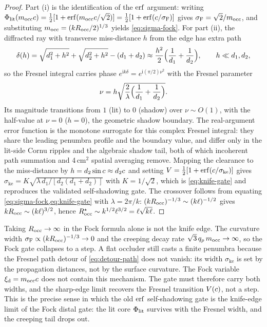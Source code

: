 \begin{proof}
Part (i) is the identification of the $\erf$ argument: writing
$\Philit(\mfock_{\mathrm{occ}}\clr)=\half[1+\erf(\mfock_{\mathrm{occ}}\clr/\sqrt2)]
=\half[1+\erf(\clr/\sigma_{\mathrm{F}})]$ gives
$\sigma_{\mathrm{F}}=\sqrt2/m_{\mathrm{occ}}$, and substituting
$m_{\mathrm{occ}}=(kR_{\mathrm{occ}}/2)^{1/3}$ yields \cref{eq:sigma-fock}. For part (ii),
the diffracted ray with transverse miss-distance $h$ from the edge has extra path
\begin{equation}\label{eq:detour-path}
  \delta(h) = \sqrt{d_1^2+h^2}+\sqrt{d_2^2+h^2}-(d_1+d_2)
  \approx \frac{h^2}{2}\Bigl(\frac1{d_1}+\frac1{d_2}\Bigr),
  \qquad h\ll d_1,d_2,
\end{equation}
so the Fresnel integral carries phase $e^{\mathrm{i}k\delta}=e^{\mathrm{i}(\pi/2)\nu^2}$
with the Fresnel parameter
\begin{equation}\label{eq:fresnel-nu}
  \nu = h\sqrt{\frac{2}{\lambda}\Bigl(\frac1{d_1}+\frac1{d_2}\Bigr)}.
\end{equation}
Its magnitude transitions from $1$ (lit) to $0$ (shadow) over $\nu\sim O(1)$, with
the half-value at $\nu=0$ ($h=0$), the geometric shadow boundary. The
real-argument error function is the monotone surrogate for this complex Fresnel
integral: they share the leading penumbra profile and the boundary value, and
differ only in the lit-side Cornu ripples and the algebraic shadow tail, both of
which incoherent path summation and 4\,cm$^2$ spatial averaging remove. Mapping
the clearance to the miss-distance by $h=d_2\sin c\approx d_2c$ and setting
$V=\half[1+\erf(\clr/\sigma_{\mathrm{ke}})]$ gives
$\sigma_{\mathrm{ke}}=K\sqrt{\lambda\,d_1/[d_2(d_1+d_2)]}$ with $K=1/\sqrt2$, which
is \cref{eq:knife-gate} and reproduces the validated self-shadowing gate. The
crossover follows from equating \cref{eq:sigma-fock,eq:knife-gate} with
$\lambda=2\pi/k$: $(kR_{\mathrm{occ}})^{-1/3}\sim(k\ell)^{-1/2}$ gives
$kR_{\mathrm{occ}}\sim(k\ell)^{3/2}$, hence $R_{\mathrm{occ}}^\star\sim k^{1/2}\ell^{3/2}=\ell\sqrt{k\ell}$.
\end{proof}

\begin{remark}\label{rem:not-a-limit}
Taking $R_{\mathrm{occ}}\to\infty$ in the Fock formula alone is not the knife edge. The
curvature width $\sigma_{\mathrm{F}}\propto(kR_{\mathrm{occ}})^{-1/3}\to0$ and the creeping
decay rate $\sqrt3\,q_p\,m_{\mathrm{occ}}\to\infty$, so the Fock gate collapses
to a step. A flat occluder still casts a finite penumbra because the Fresnel path
detour of \cref{eq:detour-path} does not vanish: its width $\sigma_{\mathrm{ke}}$
is set by the propagation distances, not by the surface curvature. The Fock
variable $\xi_{\mathrm d}=m_{\mathrm{occ}}c$ does not contain this
mechanism. The gate must therefore carry both widths, and the sharp-edge limit
recovers the Fresnel transition $V(c)$, not a step. This is the precise sense in
which the old $\erf$ self-shadowing gate is the knife-edge limit of the Fock distal
gate: the lit core $\Phi_{\mathrm{lit}}$ survives with the Fresnel width, and the creeping tail
drops out.
\end{remark}

